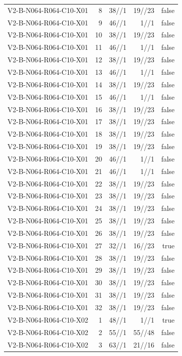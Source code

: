 {\begin{longtable}{lrrrr}
V2-B-N064-R064-C10-X01 & 8 & 38//1 & 19//23 & false \\
V2-B-N064-R064-C10-X01 & 9 & 46//1 & 1//1 & false \\
V2-B-N064-R064-C10-X01 & 10 & 38//1 & 19//23 & false \\
V2-B-N064-R064-C10-X01 & 11 & 46//1 & 1//1 & false \\
V2-B-N064-R064-C10-X01 & 12 & 38//1 & 19//23 & false \\
V2-B-N064-R064-C10-X01 & 13 & 46//1 & 1//1 & false \\
V2-B-N064-R064-C10-X01 & 14 & 38//1 & 19//23 & false \\
V2-B-N064-R064-C10-X01 & 15 & 46//1 & 1//1 & false \\
V2-B-N064-R064-C10-X01 & 16 & 38//1 & 19//23 & false \\
V2-B-N064-R064-C10-X01 & 17 & 38//1 & 19//23 & false \\
V2-B-N064-R064-C10-X01 & 18 & 38//1 & 19//23 & false \\
V2-B-N064-R064-C10-X01 & 19 & 38//1 & 19//23 & false \\
V2-B-N064-R064-C10-X01 & 20 & 46//1 & 1//1 & false \\
V2-B-N064-R064-C10-X01 & 21 & 46//1 & 1//1 & false \\
V2-B-N064-R064-C10-X01 & 22 & 38//1 & 19//23 & false \\
V2-B-N064-R064-C10-X01 & 23 & 38//1 & 19//23 & false \\
V2-B-N064-R064-C10-X01 & 24 & 38//1 & 19//23 & false \\
V2-B-N064-R064-C10-X01 & 25 & 38//1 & 19//23 & false \\
V2-B-N064-R064-C10-X01 & 26 & 38//1 & 19//23 & false \\
V2-B-N064-R064-C10-X01 & 27 & 32//1 & 16//23 & true \\
V2-B-N064-R064-C10-X01 & 28 & 38//1 & 19//23 & false \\
V2-B-N064-R064-C10-X01 & 29 & 38//1 & 19//23 & false \\
V2-B-N064-R064-C10-X01 & 30 & 38//1 & 19//23 & false \\
V2-B-N064-R064-C10-X01 & 31 & 38//1 & 19//23 & false \\
V2-B-N064-R064-C10-X01 & 32 & 38//1 & 19//23 & false \\
V2-B-N064-R064-C10-X02 & 1 & 48//1 & 1//1 & true \\
V2-B-N064-R064-C10-X02 & 2 & 55//1 & 55//48 & false \\
V2-B-N064-R064-C10-X02 & 3 & 63//1 & 21//16 & false \\

\end{longtable}}
